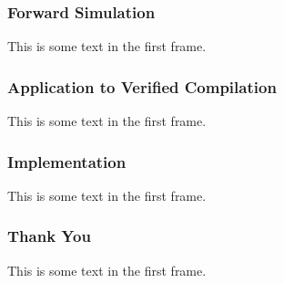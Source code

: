 \documentclass{beamer}
\begin{document}
\begin{frame}
\frametitle{Forward Simulation}
This is some text in the first frame.
\end{frame}

\begin{frame}
\frametitle{Application to Verified Compilation}
This is some text in the first frame.
\end{frame}

\begin{frame}
\frametitle{Implementation}
This is some text in the first frame.
\end{frame}

\begin{frame}
\frametitle{Thank You}
This is some text in the first frame.
\end{frame}
\end{document}
